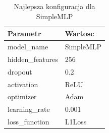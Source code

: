 \begin{table}[h]
\centering
\caption{Najlepsza konfiguracja dla SimpleMLP}
\label{tab:best_config_mlp}
\begin{tabular}{ll}
\toprule
Parametr & Wartosc \\
\midrule
model\_name & SimpleMLP \\
hidden\_features & 256 \\
dropout & 0.2 \\
activation & ReLU \\
optimizer & Adam \\
learning\_rate & 0.001 \\
loss\_function & L1Loss \\
\bottomrule
\end{tabular}
\end{table}
